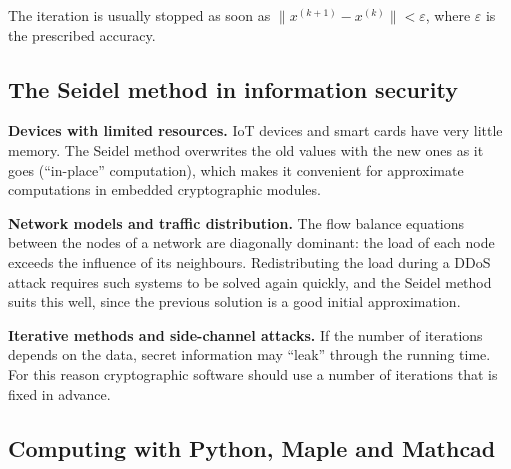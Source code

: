 \begin{eslatma}
The iteration is usually stopped as soon as
$\|x^{(k+1)}-x^{(k)}\|<\varepsilon$, where $\varepsilon$ is the prescribed
accuracy.
\end{eslatma}

\subsection{The Seidel method in information security}

\textbf{Devices with limited resources.} IoT devices and smart cards have
very little memory. The Seidel method overwrites the old values with the new
ones as it goes (“in-place” computation), which makes it convenient for
approximate computations in embedded cryptographic modules.

\textbf{Network models and traffic distribution.} The flow balance equations
between the nodes of a network are diagonally dominant: the load of each node
exceeds the influence of its neighbours. Redistributing the load during a DDoS
attack requires such systems to be solved again quickly, and the Seidel method
suits this well, since the previous solution is a good initial approximation.

\textbf{Iterative methods and side-channel attacks.} If the number of
iterations depends on the data, secret information may “leak” through the
running time. For this reason cryptographic software should use a number of
iterations that is fixed in advance.

\subsection{Computing with Python, Maple and Mathcad}

